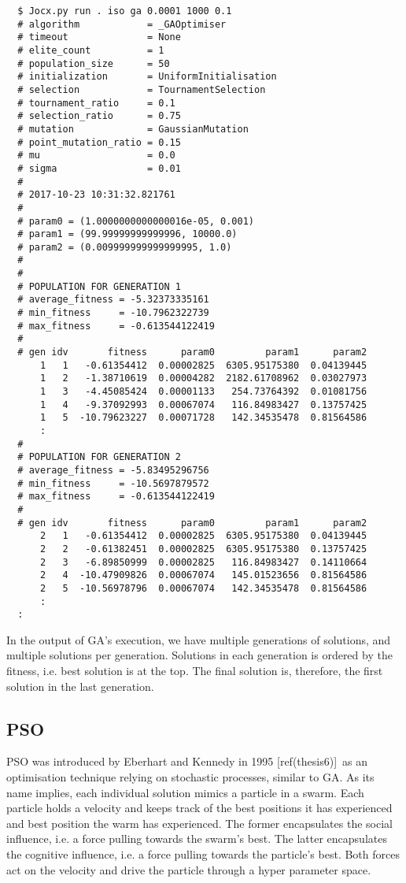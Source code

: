 \documentclass[graybox]{svmult}
\begin{document}
{\small{}\begin{verbatim}
  $ Jocx.py run . iso ga 0.0001 1000 0.1
  # algorithm            = _GAOptimiser
  # timeout              = None
  # elite_count          = 1
  # population_size      = 50
  # initialization       = UniformInitialisation
  # selection            = TournamentSelection
  # tournament_ratio     = 0.1
  # selection_ratio      = 0.75
  # mutation             = GaussianMutation
  # point_mutation_ratio = 0.15
  # mu                   = 0.0
  # sigma                = 0.01
  #
  # 2017-10-23 10:31:32.821761
  #
  # param0 = (1.0000000000000016e-05, 0.001)
  # param1 = (99.99999999999996, 10000.0)
  # param2 = (0.009999999999999995, 1.0)
  #
  #
  # POPULATION FOR GENERATION 1
  # average_fitness = -5.32373335161
  # min_fitness     = -10.7962322739
  # max_fitness     = -0.613544122419
  #
  # gen idv       fitness      param0         param1      param2
      1   1   -0.61354412  0.00002825  6305.95175380  0.04139445
      1   2   -1.38710619  0.00004282  2182.61708962  0.03027973
      1   3   -4.45085424  0.00001133   254.73764392  0.01081756
      1   4   -9.37092993  0.00067074   116.84983427  0.13757425
      1   5  -10.79623227  0.00071728   142.34535478  0.81564586
      :
  #
  # POPULATION FOR GENERATION 2
  # average_fitness = -5.83495296756
  # min_fitness     = -10.5697879572
  # max_fitness     = -0.613544122419
  #
  # gen idv       fitness      param0         param1      param2
      2   1   -0.61354412  0.00002825  6305.95175380  0.04139445
      2   2   -0.61382451  0.00002825  6305.95175380  0.13757425
      2   3   -6.89850999  0.00002825   116.84983427  0.14110664
      2   4  -10.47909826  0.00067074   145.01523656  0.81564586
      2   5  -10.56978796  0.00067074   142.34535478  0.81564586
      :
  :
\end{verbatim}}

In the output of GA's execution, we have multiple generations of solutions, and multiple solutions per generation. Solutions in each generation is ordered by the fitness, i.e. best solution is at the top. The final solution is, therefore, the first solution in the last generation.

\subsection{PSO}

PSO was introduced by Eberhart and Kennedy in 1995 [ref(thesis6)]\ as an optimisation technique relying on stochastic processes, similar to GA. As its name implies, each individual solution mimics a particle in a swarm. Each particle holds a velocity and keeps track of the best positions it has experienced and best position the warm has experienced. The former encapsulates the social influence, i.e. a force pulling towards the swarm's best. The latter encapsulates the cognitive influence, i.e. a force pulling towards the particle's best. Both forces act on the velocity and drive the particle through a hyper parameter space.
\end{document}
